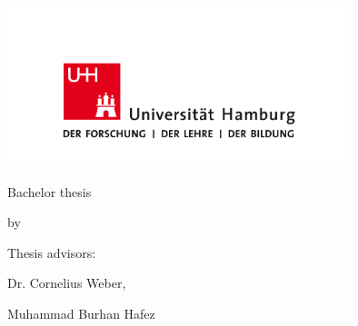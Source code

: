 \begin{titlepage}
    \centering
    \includegraphics[width=10cm]{assets/uhh_logo}\par
    \vspace{4\baselineskip}
    {\Large Bachelor thesis\par}
    {\Huge \thetitle \par}
    \vspace{4\baselineskip}
    by\par
    {\Large \theauthor \par}
    \vspace{8\baselineskip}
    \vfill
    Thesis advisors:\par
    {\large Dr. Cornelius Weber, \par Muhammad Burhan Hafez}
\end{titlepage}
